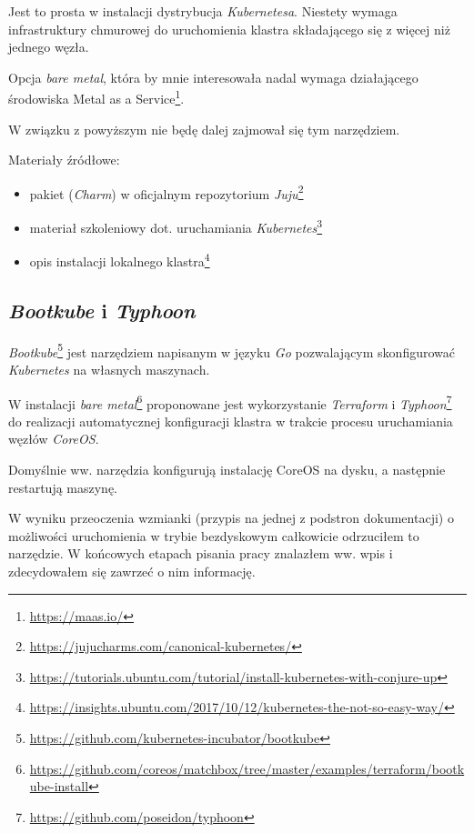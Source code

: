 \documentclass[a4paper,12pt,twoside,openany]{report}
\providecommand{\tightlist}{%
  \setlength{\itemsep}{0pt}\setlength{\parskip}{0pt}}
\DeclareRobustCommand{\href}[2]{#2\footnote{\url{#1}}}
\begin{document}
Jest to prosta w instalacji dystrybucja \emph{Kubernetesa}. Niestety
wymaga infrastruktury chmurowej do uruchomienia klastra składającego się
z więcej niż jednego węzła.

Opcja \emph{bare metal}, która by mnie interesowała nadal wymaga
działającego środowiska \href{https://maas.io/}{Metal as a Service}.

W związku z powyższym nie będę dalej zajmował się tym narzędziem.

Materiały źródłowe:

\begin{itemize}
\tightlist
\item
  \href{https://jujucharms.com/canonical-kubernetes/}{pakiet
  (\emph{Charm}) w oficjalnym repozytorium \emph{Juju}}
\item
  \href{https://tutorials.ubuntu.com/tutorial/install-kubernetes-with-conjure-up}{materiał
  szkoleniowy dot. uruchamiania \emph{Kubernetes}}
\item
  \href{https://insights.ubuntu.com/2017/10/12/kubernetes-the-not-so-easy-way/}{opis
  instalacji lokalnego klastra}
\end{itemize}

\hypertarget{bootkube-i-typhoon}{%
\subsection{\texorpdfstring{\emph{Bootkube} i
\emph{Typhoon}}{Bootkube i Typhoon}}\label{bootkube-i-typhoon}}

\href{https://github.com/kubernetes-incubator/bootkube}{\emph{Bootkube}}
jest narzędziem napisanym w języku \emph{Go} pozwalającym skonfigurować
\emph{Kubernetes} na własnych maszynach.

W instalacji
\href{https://github.com/coreos/matchbox/tree/master/examples/terraform/bootkube-install}{\emph{bare
metal}} proponowane jest wykorzystanie \emph{Terraform} i
\href{https://github.com/poseidon/typhoon}{\emph{Typhoon}} do realizacji
automatycznej konfiguracji klastra w trakcie procesu uruchamiania węzłów
\emph{CoreOS}.

Domyślnie ww. narzędzia konfigurują instalację CoreOS na dysku, a
następnie restartują maszynę.

W wyniku przeoczenia wzmianki (przypis na jednej z podstron
dokumentacji) o możliwości uruchomienia w trybie bezdyskowym całkowicie
odrzuciłem to narzędzie. W końcowych etapach pisania pracy znalazłem ww.
wpis i zdecydowałem się zawrzeć o nim informację.
\end{document}
